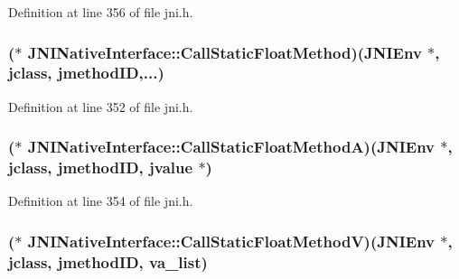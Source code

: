Definition at line 356 of file jni.\-h.

\hypertarget{struct_j_n_i_native_interface_ad6938b8cd4a1d838ee1a3d3cd988ed27}{
\subsubsection[{Call\-Static\-Float\-Method}]{($\ast$ J\-N\-I\-Native\-Interface\-::\-Call\-Static\-Float\-Method)({\bf J\-N\-I\-Env} $\ast$, {\bf jclass}, {\bf jmethod\-I\-D},...)}}\label{struct_j_n_i_native_interface_ad6938b8cd4a1d838ee1a3d3cd988ed27}


Definition at line 352 of file jni.\-h.

\hypertarget{struct_j_n_i_native_interface_a6d78f0ff465d9f6cce580f3519ccbf3e}{
\subsubsection[{Call\-Static\-Float\-Method\-A}]{($\ast$ J\-N\-I\-Native\-Interface\-::\-Call\-Static\-Float\-Method\-A)({\bf J\-N\-I\-Env} $\ast$, {\bf jclass}, {\bf jmethod\-I\-D}, {\bf jvalue} $\ast$)}}\label{struct_j_n_i_native_interface_a6d78f0ff465d9f6cce580f3519ccbf3e}


Definition at line 354 of file jni.\-h.

\hypertarget{struct_j_n_i_native_interface_a8bc58c510830ad06395e11c0cb1a219c}{
\subsubsection[{Call\-Static\-Float\-Method\-V}]{($\ast$ J\-N\-I\-Native\-Interface\-::\-Call\-Static\-Float\-Method\-V)({\bf J\-N\-I\-Env} $\ast$, {\bf jclass}, {\bf jmethod\-I\-D}, va\-\_\-list)}}\label{struct_j_n_i_native_interface_a8bc58c510830ad06395e11c0cb1a219c}


